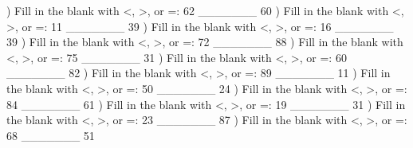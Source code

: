 \documentclass{article}%
\begin{document}
\newline%
\newline%
) Fill in the blank with <, >, or =: 62 \_\_\_\_\_\_\_ 60%
\newline%
\newline%
) Fill in the blank with <, >, or =: 11 \_\_\_\_\_\_\_ 39%
\newline%
\newline%
) Fill in the blank with <, >, or =: 16 \_\_\_\_\_\_\_ 39%
\newline%
\newline%
) Fill in the blank with <, >, or =: 72 \_\_\_\_\_\_\_ 88%
\newline%
\newline%
) Fill in the blank with <, >, or =: 75 \_\_\_\_\_\_\_ 31%
\newline%
\newline%
) Fill in the blank with <, >, or =: 60 \_\_\_\_\_\_\_ 82%
\newline%
\newline%
) Fill in the blank with <, >, or =: 89 \_\_\_\_\_\_\_ 11%
\newline%
\newline%
) Fill in the blank with <, >, or =: 50 \_\_\_\_\_\_\_ 24%
\newline%
\newline%
) Fill in the blank with <, >, or =: 84 \_\_\_\_\_\_\_ 61%
\newline%
\newline%
) Fill in the blank with <, >, or =: 19 \_\_\_\_\_\_\_ 31%
\newline%
\newline%
) Fill in the blank with <, >, or =: 23 \_\_\_\_\_\_\_ 87%
\newline%
\newline%
) Fill in the blank with <, >, or =: 68 \_\_\_\_\_\_\_ 51%
\newline%
\newline%
\end{document}
